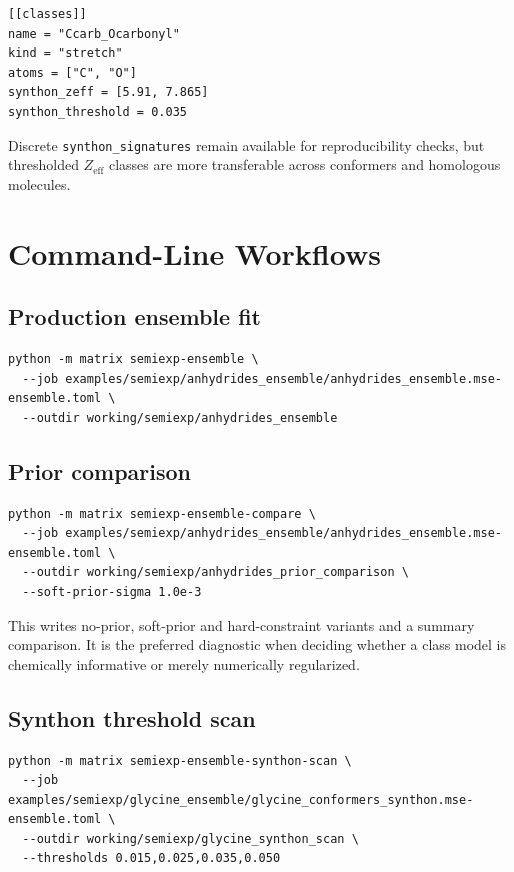 \documentclass[11pt]{article}
\newcommand{\zeff}{Z_\mathrm{eff}}
\begin{document}
\begin{lstlisting}[style=oracle]
[[classes]]
name = "Ccarb_Ocarbonyl"
kind = "stretch"
atoms = ["C", "O"]
synthon_zeff = [5.91, 7.865]
synthon_threshold = 0.035
\end{lstlisting}

\noindent
Discrete \texttt{synthon\_signatures} remain available for reproducibility
checks, but thresholded \(\zeff\) classes are more transferable across
conformers and homologous molecules.

\section{Command-Line Workflows}

\subsection{Production ensemble fit}

\begin{lstlisting}[style=oracle]
python -m matrix semiexp-ensemble \
  --job examples/semiexp/anhydrides_ensemble/anhydrides_ensemble.mse-ensemble.toml \
  --outdir working/semiexp/anhydrides_ensemble
\end{lstlisting}

\subsection{Prior comparison}

\begin{lstlisting}[style=oracle]
python -m matrix semiexp-ensemble-compare \
  --job examples/semiexp/anhydrides_ensemble/anhydrides_ensemble.mse-ensemble.toml \
  --outdir working/semiexp/anhydrides_prior_comparison \
  --soft-prior-sigma 1.0e-3
\end{lstlisting}

\noindent
This writes no-prior, soft-prior and hard-constraint variants and a summary
comparison.  It is the preferred diagnostic when deciding whether a class model
is chemically informative or merely numerically regularized.

\subsection{Synthon threshold scan}

\begin{lstlisting}[style=oracle]
python -m matrix semiexp-ensemble-synthon-scan \
  --job examples/semiexp/glycine_ensemble/glycine_conformers_synthon.mse-ensemble.toml \
  --outdir working/semiexp/glycine_synthon_scan \
  --thresholds 0.015,0.025,0.035,0.050
\end{lstlisting}
\end{document}
